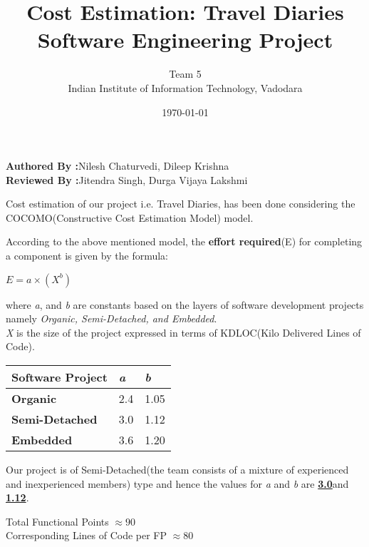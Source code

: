 \documentclass[12pt]{article}
\title{Cost Estimation: Travel Diaries\\Software Engineering Project }
\author{Team 5\\Indian Institute of Information Technology, Vadodara}
\date{\today}
\begin{document}
\maketitle
\begin{center}
\textbf{\Large{Authored By :}}\Large{Nilesh Chaturvedi, Dileep Krishna}  \\
\textbf{\Large{Reviewed By :}}\Large{Jitendra Singh, Durga Vijaya Lakshmi} \\[2\baselineskip]  
\end{center}

Cost estimation of our project i.e. Travel Diaries, has been done considering the COCOMO(Constructive Cost Estimation Model) model.

According to the above mentioned model, the \textbf{effort required}(E) for completing a component is given by the formula:

\begin{center}
$ E= a\times (X^b)$
\end{center}

where \textit{a}, and \textit{b} are constants based on the layers of software development projects namely \textit{Organic, Semi-Detached, and Embedded}.\\
\textit{X} is the size of the project expressed in terms of KDLOC(Kilo Delivered Lines of Code).\\
\begin{center}
 \begin{tabular}{ | l | l | p{1cm} |}
    \hline
    \textbf{Software Project} & \textbf{\textit{a}} & \textbf{\textit{b}}  \\ \hline
    \textbf{Organic} & 2.4 & 1.05  \\ \hline
    \textbf{Semi-Detached} & 3.0 & 1.12 \\ \hline
    \textbf{Embedded} & 3.6 & 1.20 \\
    \hline
    \end{tabular}
\end{center}

Our project is of Semi-Detached(the team consists of a mixture of experienced and inexperienced members) type and hence the values for \textit{a} and \textit{b} are \textbf{\underline{3.0}}and  \textbf{\underline{1.12}}.

\newpage

\large{Total Functional Points $\approx 90$} \\

\large{Corresponding Lines of Code per FP $\approx 80$}\\
\end{document}
